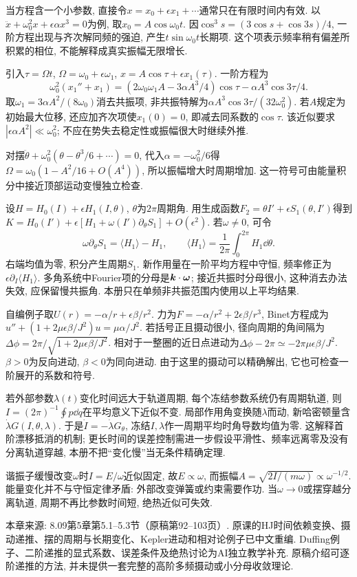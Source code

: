 
当方程含一个小参数, 直接令$x=x_0+\epsilon x_1+\cdots$通常只在有限时间内有效. 以$\ddot x+\omega_0^2x+\epsilon\alpha x^3=0$为例, 取$x_0=A\cos\omega_0t$. 因$\cos^3s=(3\cos s+\cos3s)/4$, 一阶方程出现与齐次解同频的强迫, 产生$t\sin\omega_0t$长期项. 这个项表示频率稍有偏差所积累的相位, 不能解释成真实振幅无限增长.

引入$\tau=\Omega t$, $\Omega=\omega_0+\epsilon\omega_1$, $x=A\cos\tau+\epsilon x_1(\tau)$. 一阶方程为
\[
\omega_0^2(x_1''+x_1)
=(2\omega_0\omega_1A-3\alpha A^3/4)\cos\tau
-\alpha A^3\cos3\tau/4.
\]
取$\omega_1=3\alpha A^2/(8\omega_0)$消去共振项, 非共振特解为$\alpha A^3\cos3\tau/(32\omega_0^2)$. 若$A$规定为初始最大位移, 还应加齐次项使$x_1(0)=0$, 即减去同系数的$\cos\tau$. 该近似要求$|\epsilon\alpha A^2|\ll\omega_0^2$; 不应在势失去稳定性或振幅很大时继续外推.

对摆$\ddot\theta+\omega_0^2(\theta-\theta^3/6+\cdots)=0$, 代入$\alpha=-\omega_0^2/6$得$\Omega=\omega_0(1-A^2/16+O(A^4))$, 所以振幅增大时周期增加. 这一符号可由能量积分中接近顶部运动变慢独立检查.

设$H=H_0(I)+\epsilon H_1(I,\theta)$, $\theta$为$2\pi$周期角. 用生成函数$F_2=\theta I'+\epsilon S_1(\theta,I')$得到$K=H_0(I')+\epsilon[H_1+\omega(I')\partial_\theta S_1]+O(\epsilon^2)$. 若$\omega\ne0$, 可令
\[
\omega\partial_\theta S_1=\langle H_1\rangle-H_1,\qquad
\langle H_1\rangle=\frac1{2\pi}\int_0^{2\pi}H_1\dd\theta.
\]
右端均值为零, 积分产生周期$S_1$. 新作用量在一阶平均方程中守恒, 频率修正为$\epsilon\partial_I\langle H_1\rangle$. 多角系统中Fourier项的分母是$\boldsymbol{k}\cdot\boldsymbol{\omega}$; 接近共振时分母很小, 这种消去办法失效, 应保留慢共振角. 本册只在单频非共振范围内使用以上平均结果.

自编例子取$U(r)=-\alpha/r+\epsilon\beta/r^2$. 力为$F=-\alpha/r^2+2\epsilon\beta/r^3$, Binet方程成为$u''+(1+2\mu\epsilon\beta/J^2)u=\mu\alpha/J^2$. 若括号正且摄动很小, 径向周期的角间隔为$\Delta\phi=2\pi/\sqrt{1+2\mu\epsilon\beta/J^2}$. 相对于一整圈的近日点进动为$\Delta\phi-2\pi\simeq-2\pi\mu\epsilon\beta/J^2$. $\beta>0$为反向进动, $\beta<0$为同向进动. 由于这里的摄动可以精确解出, 它也可检查一阶展开的系数和符号.

若外部参数$\lambda(t)$变化时间远大于轨道周期, 每个冻结参数系统仍有周期轨道, 则$I=(2\pi)^{-1}\oint p\dd q$在平均意义下近似不变. 局部作用角变换随$\lambda$而动, 新哈密顿量含$\dot\lambda G(I,\theta,\lambda)$. 于是$\dot I=-\dot\lambda G_\theta$, 冻结$I,\lambda$作一周期平均时角导数均值为零. 这解释首阶漂移抵消的机制; 更长时间的误差控制需进一步假设平滑性、频率远离零及没有分离轨道穿越, 本册不把“变化慢”当无条件精确定理.

谐振子缓慢改变$\omega$时$I=E/\omega$近似固定, 故$E\propto\omega$, 而振幅$A=\sqrt{2I/(m\omega)}\propto\omega^{-1/2}$. 能量变化并不与守恒定律矛盾: 外部改变弹簧或约束需要作功. 当$\omega\to0$或摆穿越分离轨道, 周期不再比参数时间短, 绝热近似可失效.

本章来源: 8.09第5章第5.1--5.3节（原稿第92--103页）. 原课的HJ时间依赖变换、摄动递推、摆的周期与长期变化、Kepler进动和相对论例子已中文重编. Duffing例子、二阶递推的显式系数、误差条件及绝热讨论为AI独立教学补充. 原稿介绍可逐阶递推的方法, 并未提供一套完整的高阶多频摄动或小分母收敛理论.
